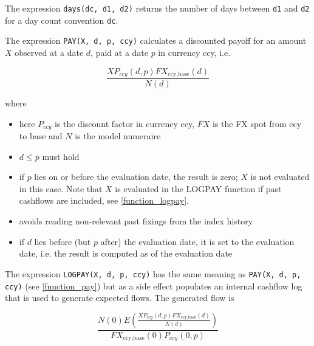 
The expression \verb+days(dc, d1, d2)+ returns the number of days between \verb+d1+ and \verb+d2+ for a day count
convention \verb+dc+.

\label{function_pay}

The expression {\tt PAY(X, d, p, ccy)} calculates a discounted payoff for an amount $X$ observed at a date $d$, paid at a
date $p$ in currency ccy, i.e.
  
\begin{equation}
  \frac{X P_{ccy}(d,p) FX_{\text{ccy},\text{base}}(d)}{N(d)}
\end{equation}

where
\begin{itemize}
\item here $P_{ccy}$ is the discount factor in currency ccy, $FX$ is the FX spot from ccy to base and $N$ is the model
  numeraire
\item $d\leq p$ must hold
\item if $p$ lies on or before the evaluation date, the result is zero; $X$ is not evaluated in this case. 
Note that $X$ is evaluated in the LOGPAY function if past cashflows are included, see \ref{function_logpay}.
\item avoids reading non-relevant past fixings from the index history
\item if $d$ lies before (but $p$ after) the evaluation date, it is set to the evaluation date, i.e. the result is
  computed as of the evaluation date
\end{itemize}

\label{function_logpay}

The expression {\tt LOGPAY(X, d, p, ccy)} has the same meaning as {\tt PAY(X, d, p, ccy)} (see \ref{function_pay}) but
as a side effect populates an internal cashflow log that is used to generate expected flows. The generated flow is

\begin{equation}
  \frac{ N(0) E\left(\frac{X P_{ccy}(d,p) FX_{\text{ccy},\text{base}}(d)}{N(d)}\right) }{ FX_{\text{ccy},\text{base}}(0) P_{ccy}(0,p) }
\end{equation}

